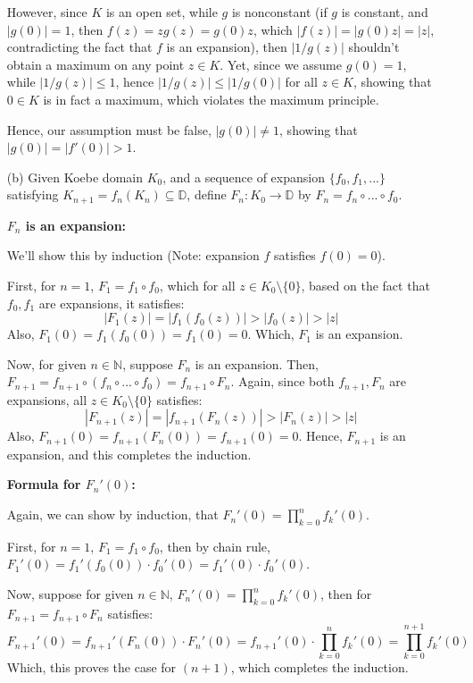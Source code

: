 \documentclass{article}
\begin{document}
\begin{itemize}
    However, since $K$ is an open set, while $g$ is nonconstant (if $g$ is constant, and $|g(0)|=1$, then $f(z)=zg(z)=g(0)z$, which $|f(z)|=|g(0)z|=|z|$, contradicting the fact that $f$ is an expansion), then $|1/g(z)|$ shouldn't obtain a maximum on any point $z\in K$.
    Yet, since we assume $g(0)=1$, while $|1/g(z)|\leq 1$, hence $|1/g(z)|\leq |1/g(0)|$ for all $z\in K$, showing that $0\in K$ is in fact a maximum, which violates the maximum principle.

    Hence, our assumption must be false, $|g(0)|\neq 1$, showing that $|g(0)|=|f'(0)|>1$.

    \hfil

    \hfil

    \item[(b)] Given Koebe domain $K_0$, and a sequence of expansion $\{f_0,f_1,...\}$ satisfying $K_{n+1}=f_n(K_n)\subseteq \mathbb{D}$, define $F_n:K_0\rightarrow\mathbb{D}$ by $F_n=f_n\circ...\circ f_0$.
    
    \hfil

    \textbf{$F_n$ is an expansion:}

    We'll show this by induction (Note: expansion $f$ satisfies $f(0)=0$). 

    First, for $n=1$, $F_1=f_1\circ f_0$, which for all $z\in K_0\setminus\{0\}$, based on the fact that $f_0,f_1$ are expansions, it satisfies:
    $$|F_1(z)| = |f_1(f_0(z))|>|f_0(z)|>|z|$$
    Also, $F_1(0)=f_1(f_0(0))=f_1(0)=0$. Which, $F_1$ is an expansion.

    Now, for given $n\in\mathbb{N}$, suppose $F_n$ is an expansion. Then, $F_{n+1}=f_{n+1}\circ (f_n\circ...\circ f_0)=f_{n+1}\circ F_n$. Again, since both $f_{n+1}, F_n$ are expansions, all $z\in K_0\setminus\{0\}$ satisfies:
    $$|F_{n+1}(z)|=|f_{n+1}(F_n(z))|>|F_n(z)|>|z|$$
    Also, $F_{n+1}(0)=f_{n+1}(F_n(0))=f_{n+1}(0)=0$. Hence, $F_{n+1}$ is an expansion, and this completes the induction.

    \hfil

    \textbf{Formula for $F_n'(0)$:}

    Again, we can show by induction, that $F_n'(0)=\prod_{k=0}^{n}f_k'(0)$.

    First, for $n=1$, $F_1=f_1\circ f_0$, then by chain rule, $F_1'(0)=f_1'(f_0(0))\cdot f_0'(0) = f_1'(0)\cdot f_0'(0)$.

    Now, suppose for given $n\in\mathbb{N}$, $F_n'(0)=\prod_{k=0}^{n}f_k'(0)$, then for $F_{n+1}=f_{n+1}\circ F_n$ satisfies:
    $$F_{n+1}'(0)=f_{n+1}'(F_n(0))\cdot F_n'(0) = f_{n+1}'(0)\cdot \prod_{k=0}^{n}f_k'(0) = \prod_{k=0}^{n+1}f_k'(0)$$
    Which, this proves the case for $(n+1)$, which completes the induction.


\end{itemize}
\end{document}
